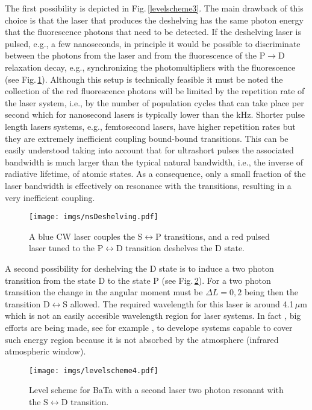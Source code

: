 The first possibility is depicted in Fig.\,\ref{levelscheme3}. The main drawback of this choice is that the laser that produces the deshelving has the same photon energy that the fluorescence photons that need to be detected. If the deshelving laser is pulsed, e.g., a few nanoseconds, in principle it would be possible to discriminate between the photons from the laser and from the fluorescence of the P$\rightarrow$D relaxation decay, e.g., synchronizing the photomultipliers with the fluorescence (see Fig.\,\ref{nsDeshelving}). Although this setup is technically feasible it must be noted the collection of the red fluorescence photons will be limited by the repetition rate of  the laser system, i.e., by the number of population cycles that can take place per second which for nanosecond lasers is typically lower than the kHz. Shorter pulse length lasers systems, e.g., femtosecond lasers, have higher repetition rates but they are extremely inefficient coupling bound-bound transitions. This can be easily understood taking into account that for ultrashort pulses the associated bandwidth is much larger than the typical natural bandwidth, i.e., the inverse of radiative lifetime, of atomic states. As a consequence, only a small fraction of the laser bandwidth is effectively on resonance with the transitions, resulting in a very inefficient coupling. 


\begin{figure}[ht!]
\texttt{[image: imgs/nsDeshelving.pdf]}
\caption{\label{nsDeshelving} A blue CW laser couples the S$\leftrightarrow$P transitions, and a red pulsed laser tuned to the P$\leftrightarrow$D transition deshelves the D state.}
\end{figure}

A second possibility for deshelving the D state is to induce a two photon transition from the state D to the state P (see Fig.\,\ref{levelscheme4}). For a two photon transition the change in the angular moment must be $\Delta L=0,2$ being then the transition D$\leftrightarrow$S allowed. The required wavelength for this laser is around 4.1\,$\mu$m which is not an easily accesible wavelength region for laser systems. In fact , big efforts are being made, see for example \cite{Evans12}, to develope systems capable to cover such energy region because                                    it is not absorbed by the atmosphere (infrared atmospheric window).

\begin{figure}[ht!]
\texttt{[image: imgs/levelscheme4.pdf]}
\caption{\label{levelscheme4} Level scheme for BaTa with a second laser two photon resonant with the S$\leftrightarrow$D transition.}
\end{figure}

